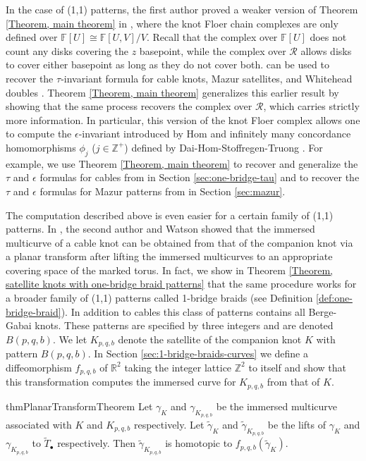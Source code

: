 \documentclass{amsart}
\newcommand{\Z}{\mathbb{Z}}
\newcommand{\R}{\mathbb{R}}
\theoremstyle{definition}
\theoremstyle{remark}
\numberwithin{equation}{section}
\numberwithin{equation}{section} \makeatletter
\begin{document}
In the case of (1,1) patterns, the first author proved a weaker version of Theorem \ref{Theorem, main theorem} in \cite[Theorem 1.2]{Chen2019}, where the knot Floer chain complexes are only defined over $\mathbb{F}[U]\cong\mathbb{F}[U,V]/V$. Recall that the complex over $\mathbb{F}[U]$ does not count any disks covering the $z$ basepoint, while the complex over $\mathcal{R}$ allows disks to cover either basepoint as long as they do not cover both. \cite[Theorem 1.2]{Chen2019} can be used to recover the $\tau$-invariant formula for cable knots, Mazur satellites, and Whitehead doubles \cite{MR2372849, MR3217622,  MR3589337}.  Theorem \ref{Theorem, main theorem} generalizes this earlier result by showing that the same process recovers the complex over $\mathcal{R}$, which carries strictly more information. In particular, this version of the knot Floer complex allows one to compute the $\epsilon$-invariant introduced by Hom \cite{MR3217622} and infinitely many concordance homomorphisms $\phi_j$ ($j\in\mathbb{Z}^+$) defined by Dai-Hom-Stoffregen-Truong \cite{Dai2021}. For example, we use Theorem \ref{Theorem, main theorem} to recover and generalize the $\tau$ and $\epsilon$ formulas for cables from \cite[Theorem 2]{MR3217622} in Section \ref{sec:one-bridge-tau} and to recover the $\tau$ and $\epsilon$ formulas for Mazur patterns from \cite[Theorem 1.4]{MR3589337} in Section \ref{sec:mazur}.

The computation described above is even easier for a certain family of (1,1) patterns. In \cite[Theorem 1]{Hanselman2023}, the second author and Watson showed that the immersed multicurve of a cable knot can be obtained from that of the companion knot via a planar transform after lifting the immersed multicurves to an appropriate covering space of the marked torus. In fact, we show in Theorem \ref{Theorem, satellite knots with one-bridge braid patterns} that the same procedure works for a broader family of (1,1) patterns called 1-bridge braids (see Definition \ref{def:one-bridge-braid}). In addition to cables this class of patterns contains all Berge-Gabai knots. These patterns are specified by three integers and are denoted $B(p,q,b)$. We let $K_{p,q,b}$ denote the satellite of the companion knot $K$ with pattern $B(p,q,b)$. In Section \ref{sec:1-bridge-braids-curves} we define a diffeomorphism $f_{p,q,b}$ of $\R^2$ taking the integer lattice $\Z^2$ to itself and show that this transformation computes the immersed curve for $K_{p,q,b}$ from that of $K$.

 \begin{restatable}{thm}{PlanarTransformTheorem}\label{Theorem, satellite knots with one-bridge braid patterns}
 	Let $\gamma_K$ and $\gamma_{K_{p,q,b}}$ be the immersed multicurve associated with $K$ and $K_{p,q,b}$ respectively. Let $\tilde{\gamma}_K$ and $\tilde{\gamma}_{K_{p,q,b}}$ be the lifts of $\gamma_K$ and $\gamma_{K_{p,q,b}}$ to $\tilde{T}_{\bullet}$ respectively. Then $\tilde{\gamma}_{K_{p,q,b}}$ is homotopic to $f_{p,q,b}(\tilde{\gamma}_K)$.
 \end{restatable}
 
\end{document}
